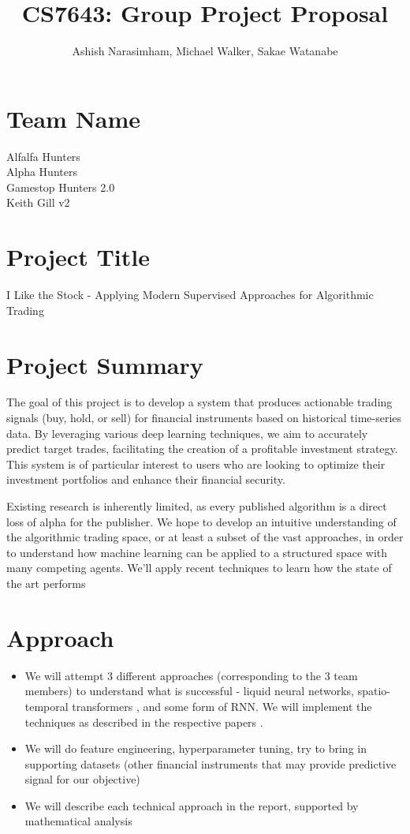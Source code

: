 \documentclass[
	letterpaper, %
]{jdf}
\author{Ashish Narasimham, Michael Walker, Sakae Watanabe}
\title{CS7643: Group Project Proposal}
\begin{document}
\maketitle

\section*{Team Name}

Alfalfa Hunters \\
Alpha Hunters \\
Gamestop Hunters 2.0 \\
Keith Gill v2 \\

\section*{Project Title}

I Like the Stock - Applying Modern Supervised Approaches for Algorithmic Trading

\section*{Project Summary}
The goal of this project is to develop a system that produces actionable trading signals (buy, hold, or sell) for financial instruments based on historical time-series data. By leveraging various deep learning techniques, we aim to accurately predict target trades, facilitating the creation of a profitable investment strategy. This system is of particular interest to users who are looking to optimize their investment portfolios and enhance their financial security.

Existing research is inherently limited, as every published algorithm is a direct loss of alpha for the publisher. We hope to develop an intuitive understanding of the algorithmic trading space, or at least a subset of the vast approaches, in order to understand how machine learning can be applied to a structured space with many competing agents. We’ll apply recent techniques to learn how the state of the art performs


\section*{Approach}

\begin{itemize}
    \item We will attempt 3 different approaches (corresponding to the 3 team members) to understand what is successful - liquid neural networks, spatio-temporal transformers \cite{boyle_spatiotemporal_2023}, and some form of RNN. We will implement the techniques as described in the respective papers \citep{kazemi_time2vec_2019,su_self-attentive_2022}.
    \item We will do feature engineering, hyperparameter tuning, try to bring in supporting datasets (other financial instruments that may provide predictive signal for our objective)
    \item We will describe each technical approach in the report, supported by mathematical analysis
\end{itemize}
\end{document}
